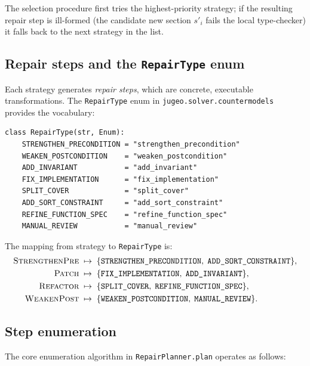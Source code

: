 \documentclass[11pt]{article}
\newcommand{\Patch}{\textsc{Patch}}
\newcommand{\Refactor}{\textsc{Refactor}}
\newcommand{\StrengthenPre}{\textsc{StrengthenPre}}
\newcommand{\WeakenPost}{\textsc{WeakenPost}}
\begin{document}
The selection procedure first tries the highest-priority strategy; if the
resulting repair step is ill-formed (\eg the candidate new section $s'_i$
fails the local type-checker) it falls back to the next strategy in the list.

\subsection{Repair steps and the \texttt{RepairType} enum}

Each strategy generates \emph{repair steps}, which are concrete, executable
transformations.  The \texttt{RepairType} enum in
\texttt{jugeo.solver.countermodels} provides the vocabulary:

\begin{lstlisting}[style=jugeo-python,caption={RepairType enum (solver/countermodels.py).}]
class RepairType(str, Enum):
    STRENGTHEN_PRECONDITION = "strengthen_precondition"
    WEAKEN_POSTCONDITION    = "weaken_postcondition"
    ADD_INVARIANT           = "add_invariant"
    FIX_IMPLEMENTATION      = "fix_implementation"
    SPLIT_COVER             = "split_cover"
    ADD_SORT_CONSTRAINT     = "add_sort_constraint"
    REFINE_FUNCTION_SPEC    = "refine_function_spec"
    MANUAL_REVIEW           = "manual_review"
\end{lstlisting}

The mapping from strategy to \texttt{RepairType} is:
\begin{align*}
  \StrengthenPre &\;\mapsto\;
    \{\texttt{STRENGTHEN\_PRECONDITION},\; \texttt{ADD\_SORT\_CONSTRAINT}\},\\
  \Patch         &\;\mapsto\;
    \{\texttt{FIX\_IMPLEMENTATION},\; \texttt{ADD\_INVARIANT}\},\\
  \Refactor      &\;\mapsto\;
    \{\texttt{SPLIT\_COVER},\; \texttt{REFINE\_FUNCTION\_SPEC}\},\\
  \WeakenPost    &\;\mapsto\;
    \{\texttt{WEAKEN\_POSTCONDITION},\; \texttt{MANUAL\_REVIEW}\}.
\end{align*}

\subsection{Step enumeration}

The core enumeration algorithm in \texttt{RepairPlanner.plan} operates as
follows:
\end{document}
